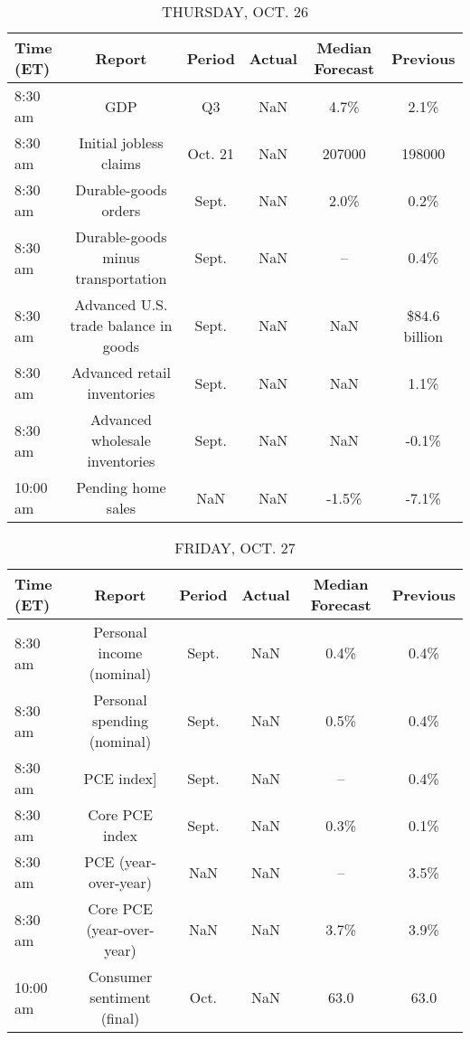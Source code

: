 \documentclass{article}%
\begin{document}
\begin{table}[htbp]%
\caption{THURSDAY, OCT. 26}%
\centering%
\begin{adjustbox}{width=1\textwidth}%
\begin{tabular}{lccccc}
\toprule
Time (ET) &                               Report &  Period & Actual & Median Forecast &      Previous \\
\midrule
  8:30 am &                                  GDP &      Q3 &    NaN &            4.7\% &          2.1\% \\
  8:30 am &               Initial jobless claims & Oct. 21 &    NaN &          207000 &        198000 \\
  8:30 am &                 Durable-goods orders &   Sept. &    NaN &            2.0\% &          0.2\% \\
  8:30 am &   Durable-goods minus transportation &   Sept. &    NaN &              -- &          0.4\% \\
  8:30 am & Advanced U.S. trade balance in goods &   Sept. &    NaN &             NaN & \$84.6 billion \\
  8:30 am &          Advanced retail inventories &   Sept. &    NaN &             NaN &          1.1\% \\
  8:30 am &       Advanced wholesale inventories &   Sept. &    NaN &             NaN &         -0.1\% \\
 10:00 am &                   Pending home sales &     NaN &    NaN &           -1.5\% &         -7.1\% \\
\bottomrule
\end{tabular}
%
\end{adjustbox}%
\end{table}

%


\begin{table}[htbp]%
\caption{FRIDAY, OCT. 27}%
\centering%
\begin{adjustbox}{width=1\textwidth}%
\begin{tabular}{lccccc}
\toprule
Time (ET) &                      Report & Period & Actual & Median Forecast & Previous \\
\midrule
  8:30 am &   Personal income (nominal) &  Sept. &    NaN &            0.4\% &     0.4\% \\
  8:30 am & Personal spending (nominal) &  Sept. &    NaN &            0.5\% &     0.4\% \\
  8:30 am &                  PCE index] &  Sept. &    NaN &              -- &     0.4\% \\
  8:30 am &              Core PCE index &  Sept. &    NaN &            0.3\% &     0.1\% \\
  8:30 am &        PCE (year-over-year) &    NaN &    NaN &              -- &     3.5\% \\
  8:30 am &   Core PCE (year-over-year) &    NaN &    NaN &            3.7\% &     3.9\% \\
 10:00 am &  Consumer sentiment (final) &   Oct. &    NaN &            63.0 &     63.0 \\
\bottomrule
\end{tabular}
%
\end{adjustbox}%
\end{table}
\end{document}
